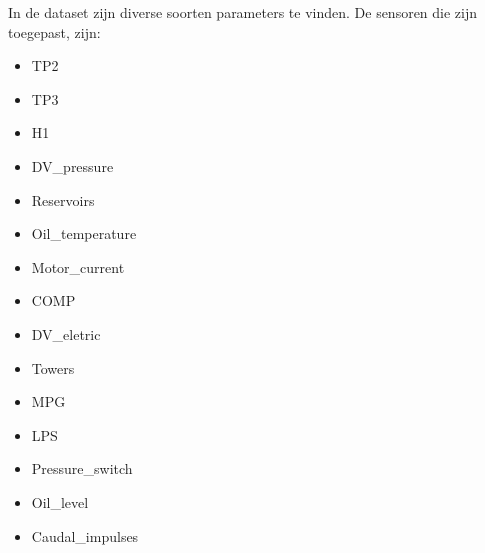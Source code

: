 

In de dataset zijn diverse soorten parameters te vinden. De sensoren die zijn toegepast, zijn:

\begin{itemize}
    
    \item TP2
    
    \item TP3
    
    \item H1
    
    \item DV\_pressure
    
    \item Reservoirs
    
    \item Oil\_temperature
    
    \item Motor\_current
    
    \item COMP
    
    \item DV\_eletric
    
    \item Towers
    
    \item MPG
    
    \item LPS
    
    \item Pressure\_switch
    
    \item Oil\_level
    
    \item Caudal\_impulses
    
\end{itemize}

